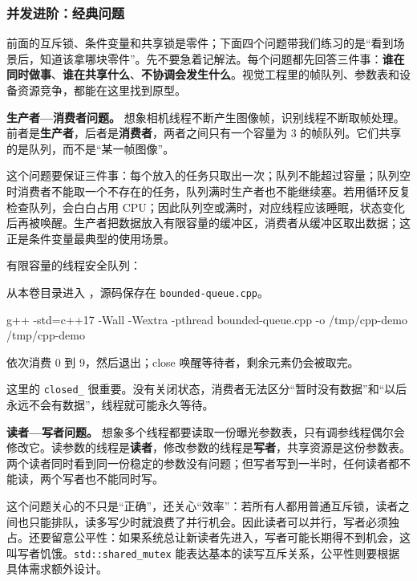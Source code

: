 \subsubsection{并发进阶：经典问题}
前面的互斥锁、条件变量和共享锁是零件；下面四个问题带我们练习的是“看到场景后，知道该拿哪块零件”。先不要急着记解法。每个问题都先回答三件事：\textbf{谁在同时做事}、\textbf{谁在共享什么}、\textbf{不协调会发生什么}。视觉工程里的帧队列、参数表和设备资源竞争，都能在这里找到原型。

\textbf{生产者—消费者问题。}
想象相机线程不断产生图像帧，识别线程不断取帧处理。前者是\textbf{生产者}，后者是\textbf{消费者}，两者之间只有一个容量为 3 的帧队列。它们共享的是队列，而不是“某一帧图像”。

这个问题要保证三件事：每个放入的任务只取出一次；队列不能超过容量；队列空时消费者不能取一个不存在的任务，队列满时生产者也不能继续塞。若用循环反复检查队列，会白白占用 CPU；因此队列空或满时，对应线程应该睡眠，状态变化后再被唤醒。生产者把数据放入有限容量的缓冲区，消费者从缓冲区取出数据；这正是条件变量最典型的使用场景。

\begin{example}
有限容量的线程安全队列：



从本卷目录进入 ，源码保存在 \texttt{bounded-queue.cpp}。
\begin{tbash}
g++ -std=c++17 -Wall -Wextra -pthread bounded-queue.cpp -o /tmp/cpp-demo
/tmp/cpp-demo
\end{tbash}
依次消费 0 到 9，然后退出；close 唤醒等待者，剩余元素仍会被取完。
\end{example}

这里的 \texttt{closed\_} 很重要。没有关闭状态，消费者无法区分“暂时没有数据”和“以后永远不会有数据”，线程就可能永久等待。

\textbf{读者—写者问题。}
想象多个线程都要读取一份曝光参数表，只有调参线程偶尔会修改它。读参数的线程是\textbf{读者}，修改参数的线程是\textbf{写者}，共享资源是这份参数表。两个读者同时看到同一份稳定的参数没有问题；但写者写到一半时，任何读者都不能读，两个写者也不能同时写。

这个问题关心的不只是“正确”，还关心“效率”：若所有人都用普通互斥锁，读者之间也只能排队，读多写少时就浪费了并行机会。因此读者可以并行，写者必须独占。还要留意公平性：如果系统总让新读者先进入，写者可能长期得不到机会，这叫写者饥饿。\texttt{std::shared\_mutex} 能表达基本的读写互斥关系，公平性则要根据具体需求额外设计。

